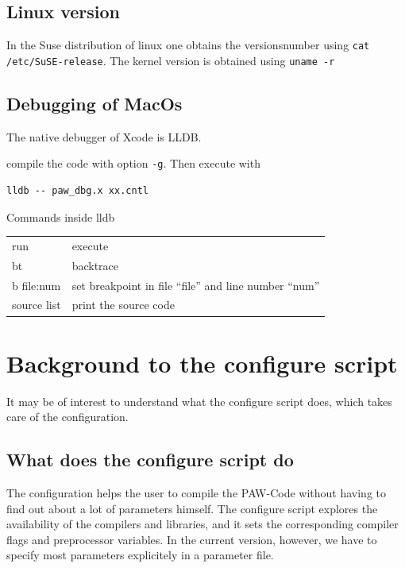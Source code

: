 \documentclass[a4paper,10pt]{report}
\begin{document}
\subsection{Linux version}
In the Suse distribution of linux one obtains the versionsnumber using
\verb+cat /etc/SuSE-release+.  The kernel version is obtained using
\verb+uname -r+

\subsection{Debugging of MacOs}
The native debugger of Xcode is LLDB.

compile the code with option \verb|-g|. Then execute with
\begin{verbatim}
lldb -- paw_dbg.x xx.cntl
\end{verbatim}

Commands inside lldb
\begin{tabular}{ll}
run & execute \\
bt  & backtrace \\
b file:num & set breakpoint in file ``file'' and line number ``num''\\
source list & print the source code\\
\end{tabular}



\section{Background to the configure script}
\label{sec:configurebackground}
It may be of interest to understand what the configure script does,
which takes care of the configuration.

\subsection{What does the configure script do}
The configuration helps the user to compile the PAW-Code without
having to find out about a lot of parameters himself.  The configure
script explores the availability of the compilers and libraries, and
it sets the corresponding compiler flags and preprocessor
variables. In the current version, however, we have to specify most
parameters explicitely in a parameter file.
\end{document}
